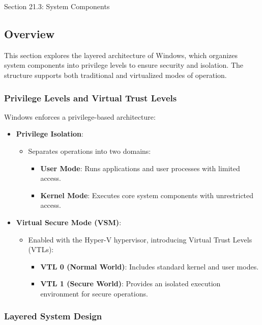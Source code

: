 \begin{notes}{Section 21.3: System Components}
    \subsection*{Overview}

    This section explores the layered architecture of Windows, which organizes system components into privilege levels to ensure security and isolation. The structure supports both traditional and 
    virtualized modes of operation.
    
    \subsubsection*{Privilege Levels and Virtual Trust Levels}
    
    Windows enforces a privilege-based architecture:
    \begin{itemize}
        \item \textbf{Privilege Isolation}:
        \begin{itemize}
            \item Separates operations into two domains:
            \begin{itemize}
                \item \textbf{User Mode}: Runs applications and user processes with limited access.
                \item \textbf{Kernel Mode}: Executes core system components with unrestricted access.
            \end{itemize}
        \end{itemize}
        \item \textbf{Virtual Secure Mode (VSM)}:
        \begin{itemize}
            \item Enabled with the Hyper-V hypervisor, introducing Virtual Trust Levels (VTLs):
            \begin{itemize}
                \item \textbf{VTL 0 (Normal World)}: Includes standard kernel and user modes.
                \item \textbf{VTL 1 (Secure World)}: Provides an isolated execution environment for secure operations.
            \end{itemize}
        \end{itemize}
    \end{itemize}
    
    \subsubsection*{Layered System Design}
    

\end{notes}
